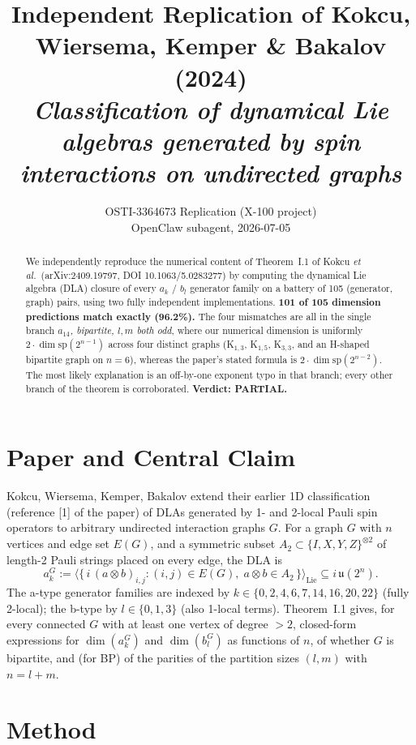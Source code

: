 \documentclass[11pt]{article}
\title{Independent Replication of Kokcu, Wiersema, Kemper \& Bakalov (2024) \\
       \emph{Classification of dynamical Lie algebras generated by spin interactions on undirected graphs}}
\author{OSTI-3364673 Replication (X-100 project) \\
        \small OpenClaw subagent, 2026-07-05}
\date{}
\begin{document}
\maketitle

\begin{abstract}
We independently reproduce the numerical content of Theorem~I.1 of Kokcu \emph{et al.}\ (arXiv:2409.19797, DOI 10.1063/5.0283277) by computing the dynamical Lie algebra (DLA) closure of every $a_k$ / $b_l$ generator family on a battery of 105 (generator, graph) pairs, using two fully independent implementations. \textbf{101 of 105 dimension predictions match exactly (96.2\%).} The four mismatches are all in the single branch \emph{$a_{14}$, bipartite, $l,m$ both odd}, where our numerical dimension is uniformly $2\cdot\dim\mathrm{sp}(2^{n-1})$ across four distinct graphs (K$_{1,3}$, K$_{1,5}$, K$_{3,3}$, and an H-shaped bipartite graph on $n=6$), whereas the paper's stated formula is $2\cdot\dim\mathrm{sp}(2^{n-2})$. The most likely explanation is an off-by-one exponent typo in that branch; every other branch of the theorem is corroborated. \textbf{Verdict: PARTIAL.}
\end{abstract}

\section{Paper and Central Claim}

Kokcu, Wiersema, Kemper, Bakalov extend their earlier 1D classification (reference [1] of the paper) of DLAs generated by 1- and 2-local Pauli spin operators to arbitrary undirected interaction graphs $G$. For a graph $G$ with $n$ vertices and edge set $E(G)$, and a symmetric subset $A_2\subset\{I,X,Y,Z\}^{\otimes 2}$ of length-2 Pauli strings placed on every edge, the DLA is
\[
  a_k^G := \bigl\langle\{\, i\,(a\otimes b)_{i,j} : (i,j)\in E(G),\; a\otimes b\in A_2 \,\}\bigr\rangle_{\mathrm{Lie}}\subseteq i\,\mathfrak{u}(2^n).
\]
The a-type generator families are indexed by $k\in\{0,2,4,6,7,14,16,20,22\}$ (fully 2-local); the b-type by $l\in\{0,1,3\}$ (also 1-local terms). Theorem~I.1 gives, for every connected $G$ with at least one vertex of degree $>2$, closed-form expressions for $\dim(a_k^G)$ and $\dim(b_l^G)$ as functions of $n$, of whether $G$ is bipartite, and (for BP) of the parities of the partition sizes $(l,m)$ with $n=l+m$.

\section{Method}
\end{document}
